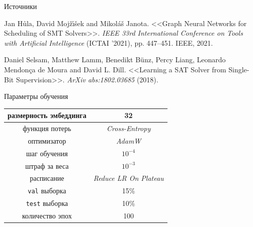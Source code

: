 \documentclass[14pt,aspectratio=169,hyperref={pdftex,unicode},xcolor=dvipsnames]{beamer}
\begin{document}
\begin{frame}{Источники}
\begin{thebibliography}{1}
 Jan H\r{u}la, David Moj\v{z}\'{\i}\v{s}ek and Mikol\'{a}\v{s} Janota. <<Graph Neural Networks for Scheduling of SMT Solvers>>. \textit{IEEE 33rd International Conference on Tools with Artificial Intelligence} (ICTAI '2021), pp. 447--451. IEEE, 2021.

 Daniel Selsam, Matthew Lamm, Benedikt B\"{u}nz, Percy Liang, Leonardo Mendonça de Moura and David L. Dill. <<Learning a SAT Solver from Single-Bit Supervision>>. \textit{ArXiv abs:1802.03685} (2018).

\end{thebibliography}

\end{frame}



\begin{frame}[noframenumbering]{Параметры обучения}

\begin{table}[ht]
\begin{center}
\begin{tabular}{cc}
  \hline
  размерность эмбеддинга & 32 \\
  \hline
  функция потерь         & \textit{Cross-Entropy} \\
  оптимизатор            & \textit{AdamW} \\
  шаг обучения           & $10^{-4}$ \\
  штраф за веса          & $10^{-3}$ \\
  расписание             & \textit{Reduce LR On Plateau} \\
  \hline
  \texttt{val} выборка   & 15\% \\
  \texttt{test} выборка  & 10\% \\
  количество эпох        & 100
\end{tabular}
\end{center}
\end{table}

\end{frame}
\end{document}
